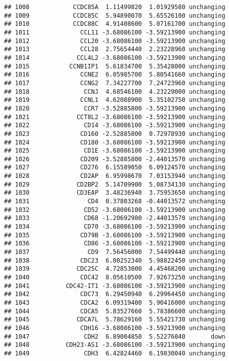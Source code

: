 \documentclass[]{article}
\begin{document}
\begin{verbatim}
## 1008            CCDC85A  1.11499820  1.01929580 unchanging
## 1009            CCDC85C  5.94890070  5.65526100 unchanging
## 1010            CCDC88C  4.91408600  5.07161700 unchanging
## 1011              CCL11 -3.68086100 -3.59213900 unchanging
## 1012              CCL20 -3.68086100 -3.59213900 unchanging
## 1013              CCL28  2.75654440  2.23228960 unchanging
## 1014             CCL4L2 -3.68086100 -3.59213900 unchanging
## 1015           CCNB1IP1  5.61834700  5.35428000 unchanging
## 1016              CCNE2  6.05985700  5.80541660 unchanging
## 1017              CCNG2  7.34227700  7.24723960 unchanging
## 1018               CCNJ  4.68546100  4.23229000 unchanging
## 1019              CCNL1  4.62088900  5.35102750 unchanging
## 1020               CCR7 -3.52885800 -3.59213900 unchanging
## 1021             CCT8L2 -3.68086100 -3.59213900 unchanging
## 1022               CD14 -3.68086100 -3.59213900 unchanging
## 1023              CD160 -2.52885800  0.72978930 unchanging
## 1024              CD180 -3.68086100 -3.59213900 unchanging
## 1025               CD1E -3.68086100 -3.59213900 unchanging
## 1026              CD209 -3.52885800 -2.44013570 unchanging
## 1027              CD276  6.15589050  6.09124570 unchanging
## 1028              CD2AP  6.95998670  7.03153940 unchanging
## 1029             CD2BP2  5.14709900  5.08734130 unchanging
## 1030             CD3EAP  3.48236940  3.75953650 unchanging
## 1031                CD4  0.37803268 -0.44013572 unchanging
## 1032               CD52 -3.68086100 -3.59213900 unchanging
## 1033               CD68 -1.20692980 -2.44013570 unchanging
## 1034               CD70 -3.68086100 -3.59213900 unchanging
## 1035              CD79B -3.68086100 -3.59213900 unchanging
## 1036               CD86 -3.68086100 -3.59213900 unchanging
## 1037                CD9  7.56456000  7.54499440 unchanging
## 1038              CDC23  6.00252340  5.98822450 unchanging
## 1039             CDC25C  4.72853000  4.45468200 unchanging
## 1040              CDC42  8.05610500  7.92673250 unchanging
## 1041          CDC42-IT1 -3.68086100 -3.59213900 unchanging
## 1042              CDC73  6.29450940  6.29964450 unchanging
## 1043              CDCA2  6.09319400  5.90416000 unchanging
## 1044              CDCA5  5.83527660  5.78386600 unchanging
## 1045             CDCA7L  5.78629160  5.55421730 unchanging
## 1046              CDH16 -3.68086100 -3.59213900 unchanging
## 1047               CDH2  6.89004850  5.52276040       down
## 1048          CDH23-AS1 -3.68086100 -3.59213900 unchanging
## 1049               CDH3  6.42824460  6.19830040 unchanging

\end{verbatim}
\end{document}
